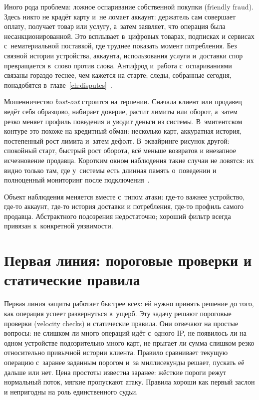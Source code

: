 Иного рода проблема: ложное оспаривание собственной покупки
(friendly fraud). Здесь никто не крадёт карту и~не ломает аккаунт:
держатель сам совершает оплату, получает товар или услугу, а~затем
заявляет, что операция была несанкционированной. Это всплывает
в~цифровых товарах, подписках и сервисах с~нематериальной поставкой,
где труднее показать момент потребления. Без связной истории устройства,
аккаунта, использования услуги и~доставки спор превращается в~слово
против слова. Антифрод и~работа с~оспариваниями связаны гораздо
теснее, чем кажется на старте; следы, собранные сегодня, понадобятся
в~главе~\ref{ch:disputes}~\cite{mc-first-party-trust}.

Мошенничество \textit{bust-out} строится на терпении. Сначала клиент или
продавец ведёт себя образцово, набирает доверие, растит лимиты или
оборот, а~затем резко меняет профиль поведения и уводит деньги из
системы. В~эмитентском контуре это похоже на кредитный обман:
несколько карт, аккуратная история, постепенный рост лимита и~затем
дефолт. В~эквайринге рисунок другой: спокойный старт, быстрый рост
оборота, всё меньше возвратов и внезапное исчезновение продавца.
Коротким окном наблюдения такие случаи не ловятся: их видно только
там, где у~системы есть длинная память о~поведении и полноценный
мониторинг после подключения~\cite{visa-merchant-screening-service,mc-fraudulent-merchants-2025}.

Объект наблюдения меняется вместе с~типом атаки: где-то важнее
устройство, где-то аккаунт, где-то история доставки и потребления,
где-то профиль самого продавца. Абстрактного подозрения недостаточно;
хороший фильтр всегда привязан к~конкретной уязвимости.

\section{Первая линия: пороговые проверки и статические правила}\label{sec:fraud-rules}

Первая линия защиты работает быстрее всех: ей нужно принять решение
до того, как операция успеет развернуться в~ущерб. Эту задачу решают
пороговые проверки (velocity checks) и статические правила. Они
отвечают на простые вопросы: не слишком ли много операций идёт
с~одного IP, не появилось ли на одном устройстве подозрительно много
карт, не прыгает ли сумма слишком резко относительно привычной истории
клиента. Правило сравнивает текущую операцию с~заранее заданным
порогом и~за миллисекунды решает, пускать её дальше или нет. Цена
простоты известна заранее: жёсткие пороги режут нормальный поток,
мягкие пропускают атаку. Правила хороши как первый заслон и непригодны
на роль единственного судьи.

